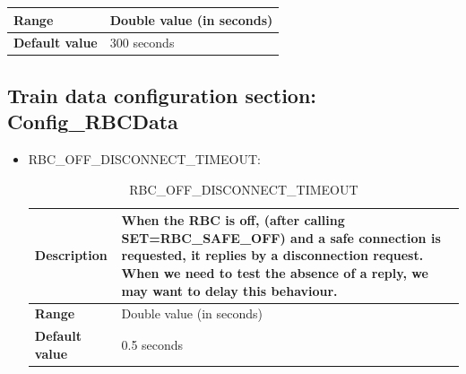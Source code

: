 \begin{itemize}
\begin{longtable}{|l|l|}
				\hline

					\begin{minipage}[t]{0.22\linewidth} \textbf{Range}	\end{minipage}
				&	\begin{minipage}[t]{0.78\linewidth} Double value (in seconds) \end{minipage} \\

				\hline

					\begin{minipage}[t]{0.22\linewidth} \textbf{Default value}	\end{minipage}
				&	\begin{minipage}[t]{0.78\linewidth} 300 seconds \end{minipage} \\

				\hline
			\end{longtable}

	\end{itemize}
\subsection{Train data configuration section: Config\_RBCData}
	\begin{itemize}
			\item RBC\_OFF\_DISCONNECT\_TIMEOUT:

			\begin{longtable}{|l|l|}
				\caption{RBC\_OFF\_DISCONNECT\_TIMEOUT}\\
				\hline

					\begin{minipage}[t]{0.22\linewidth} \textbf{Description}	\end{minipage}
				&	\begin{minipage}[t]{0.78\linewidth} When the RBC is off, (after calling SET=RBC\_SAFE\_OFF) and a safe connection is requested, it replies by a disconnection request. When we need to test the absence of a reply, we may want to delay this behaviour. \end{minipage} \\

				\hline

					\begin{minipage}[t]{0.22\linewidth} \textbf{Range}	\end{minipage}
				&	\begin{minipage}[t]{0.78\linewidth} Double value (in seconds) \end{minipage} \\

				\hline

					\begin{minipage}[t]{0.22\linewidth} \textbf{Default value}	\end{minipage}
				&	\begin{minipage}[t]{0.78\linewidth} 0.5 seconds \end{minipage} \\

				\hline
			\end{longtable}
	\end{itemize}

